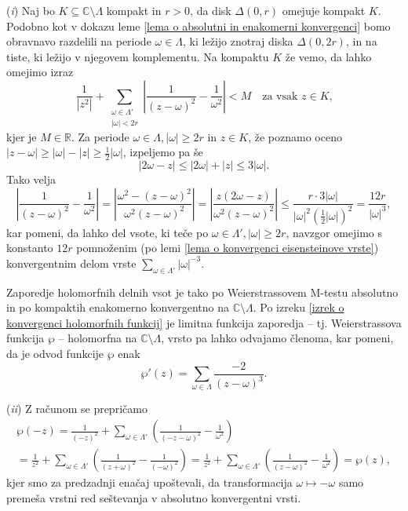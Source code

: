 \documentclass[mat1]{fmfdelo}
\numberwithin{equation}{section}
\newcommand{\R}{\mathbb R}
\newcommand{\N}{\mathbb N}
\newcommand{\C}{\mathbb C}
\newcommand{\om}{\omega}
\newcommand{\abs}[1]{\left\lvert #1 \right\rvert}
\newcommand{\disk}[2]{\Delta(#1, #2)}
\theoremstyle{definition}
\begin{document}
\begin{dokaz}
    (\emph{i}) Naj bo $K \subseteq \C\setminus\Lambda$ kompakt in $r > 0$, da disk $\disk{0}{r}$ omejuje kompakt $K$. Podobno kot v dokazu leme \ref{lema o absolutni in enakomerni konvergenci} bomo obravnavo razdelili na periode $\om\in \Lambda$, ki ležijo znotraj diska $\disk{0}{2r}$, in na tiste, ki ležijo v njegovem komplementu. Na kompaktu $K$ že vemo, da lahko omejimo izraz
    \[
        \frac{1}{\abs{z^2}} + \sum_{\substack{\om\in\Lambda' \\ \abs{\om} < 2r}} \left\lvert\frac{1}{(z - \om)^2} - \frac{1}{\om^2}\right\rvert < M \quad \text{za vsak $z \in K$,}
    \]
    kjer je $M \in \R$.
    Za periode $\om\in\Lambda, \abs{\om} \geq 2r$ in $z \in K$, že poznamo oceno $\abs{z - \om} \geq \abs{\om} - \abs{z} \geq \frac{1}{2}\abs{\om}$, izpeljemo pa še
    \[
        \abs{2\om - z} \leq \abs{2\om} + \abs{z} \leq 3 \abs{\om}.
    \]
    Tako velja
    \[
        \abs{\frac{1}{(z - \om)^2} - \frac{1}{\om^2}} = 
        \abs{\frac{\om^2 - (z - \om)^2}{\om^2(z - \om)^2}} =
        \abs{\frac{z(2\om - z)}{\om^2 (z - \om)^2}} \leq
        \frac{r \cdot 3\abs{\om}}{\abs{\om}^2(\frac{1}{2}\abs{\om})^2} = 
        \frac{12r}{\abs{\om}^3},
    \]
    kar pomeni, da lahko del vsote, ki teče po $\om\in\Lambda', \abs{\om} \geq 2r$, navzgor omejimo s konstanto $12r$ pomnoženim (po lemi \ref{lema o konvergenci eisensteinove vrste}) konvergentnim delom vrste $\sum_{\om\in\Lambda'}\abs{\om}^{-3}$.

    Zaporedje holomorfnih delnih vsot je tako po Weierstrassovem M-testu absolutno in po kompaktih enakomerno konvergentno na $\C\setminus\Lambda$. Po izreku \ref{izrek o konvergenci holomorfnih funkcij} je limitna funkcija zaporedja -- tj. Weierstrassova funkcija $\wp$ -- holomorfna na $\C\setminus\Lambda$, vrsto pa lahko odvajamo členoma, kar pomeni, da je odvod funkcije $\wp$ enak
    \[
        \wp'(z) = \sum_{\om \in \Lambda}\frac{-2}{(z-\om)^3}. 
    \]

    (\emph{ii}) Z računom se prepričamo
    \begin{multline*}
        \wp(-z) =   
        \frac{1}{(-z)^2} + \sum_{\om\in\Lambda'}\left(\frac{1}{(-z-\om)^2} - \frac{1}{\om^2}\right) \\ = 
        \frac{1}{z^2} + \sum_{\om\in\Lambda'}\left(\frac{1}{(z+\om)^2} - \frac{1}{(-\om)^2}\right) =
        \frac{1}{z^2} + \sum_{\om\in\Lambda'}\left(\frac{1}{(z-\om)^2} - \frac{1}{\om^2}\right) =
        \wp(z),
    \end{multline*}
    kjer smo za predzadnji enačaj upoštevali, da transformacija $\omega \mapsto -\omega$ samo premeša vrstni red seštevanja v absolutno konvergentni vrsti.


\end{dokaz}
\end{document}
